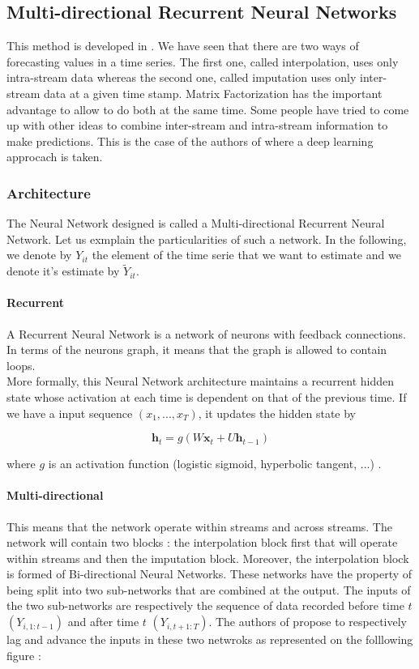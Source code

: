 \documentclass{article}
\begin{document}
\subsection*{Multi-directional Recurrent Neural Networks}
This method is developed in \cite{Yoon2017MultidirectionalRN}.
We have seen that there are two ways of forecasting values in a time series.
The first one, called interpolation, uses only intra-stream data whereas the second one, called imputation uses only inter-stream data at a given time stamp.
Matrix Factorization has the important advantage to allow to do both at the same time.
Some people have tried to come up with other ideas to combine inter-stream and intra-stream information to make predictions. This is the case of the authors of \cite{Yoon2017MultidirectionalRN} where a deep learning approcach is taken. \\

\subsubsection*{Architecture}
The Neural Network designed is called a Multi-directional Recurrent Neural Network. Let us exmplain the particularities of such a network. In the following, we denote by $Y_{it}$ the element of the time serie that we want to estimate and we denote it's estimate by $\tilde{Y}_{it}$.

\paragraph{Recurrent} A Recurrent Neural Network is a network of neurons with feedback connections. In terms of the neurons graph, it means that the graph is allowed to contain loops. \\
More formally, this Neural Network architecture maintains a recurrent hidden state whose activation at each time is dependent on that of the previous time. If we have a input sequence $(x_1, ..., x_T)$, it updates the hidden state by

$$\mathbf{h}_t = g(W\mathbf{x}_t + U\mathbf{h}_{t-1})$$

where $g$ is an activation function (logistic sigmoid, hyperbolic tangent, ...) \cite{ChungGCB14}.

\paragraph{Multi-directional} This means that the network operate within streams and across streams. The network will contain two blocks : the interpolation block first that will operate within streams and then the imputation block. Moreover, the interpolation block is formed of Bi-directional Neural Networks. These networks have the property of being split into two sub-networks that are combined at the output. The inputs of the two sub-networks are respectively the sequence of data recorded before time $t$ $(Y_{i,1:t-1})$ and after time $t$ $(Y_{i,t+1:T})$. The authors of \cite{Yoon2017MultidirectionalRN} propose to respectively lag and advance the inputs in these two netwroks as represented on the folllowing figure :
\end{document}
